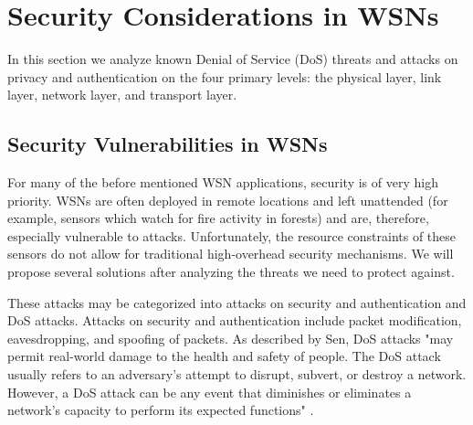 \documentclass[12pt,a4paper,twoside]{report}
\begin{document}
\section{Security Considerations in WSNs}
In this section we analyze known Denial of Service (DoS) threats and attacks on privacy and authentication on the four primary levels: the physical layer, link layer, network layer, and transport layer. 
\subsection{Security Vulnerabilities in WSNs}
For many of the before mentioned WSN applications, security is of very high priority. WSNs are often deployed in remote locations and left unattended (for example, sensors which watch for fire activity in forests) and are, therefore, especially vulnerable to attacks. Unfortunately, the resource constraints of these sensors do not allow for traditional high-overhead security mechanisms. We will propose several solutions after analyzing the threats we need to protect against. \par
These attacks may be categorized into attacks on security and authentication and DoS attacks. Attacks on security and authentication include packet modification, eavesdropping, and spoofing of packets. As described by Sen, DoS attacks "may permit real-world damage to the health and safety of people. The DoS attack usually refers to an adversary's attempt to disrupt, subvert, or destroy a network. However, a DoS attack can be any event that diminishes or eliminates a network's capacity to perform its expected functions" \cite{sen:2009}.\par
\end{document}
